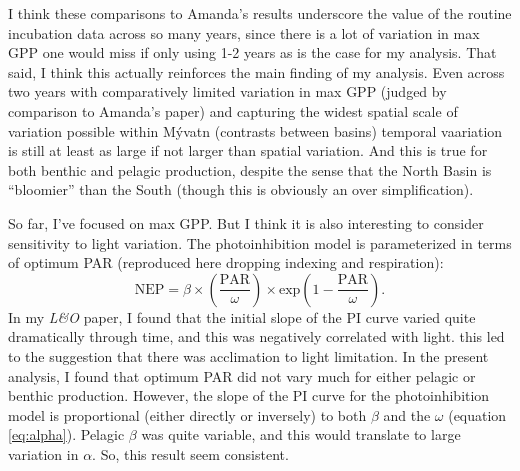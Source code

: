 \documentclass[12pt]{article}
\begin{document}
I think these comparisons to Amanda's results underscore the value of the routine incubation
data across so many years, since there is a lot of variation in max GPP one would miss
if only using 1-2 years as is the case for my analysis.
That said, I think this actually reinforces the main finding of my analysis.
Even across two years with comparatively limited variation in max GPP 
(judged by comparison to Amanda's paper) 
and capturing the widest spatial scale of variation possible within M\'{y}vatn 
(contrasts between basins) 
temporal vaariation is still at least as large if not larger than spatial variation.
And this is true for both benthic and pelagic production,
despite the sense that the North Basin is ``bloomier'' than the South 
(though this is obviously an over simplification).

So far, I've focused on max GPP. 
But I think it is also interesting to consider sensitivity to light variation.
The photoinhibition model is parameterized in terms of optimum PAR 
(reproduced here dropping indexing and respiration):
%
\begin{equation} \label{eq:pi-curve-simp}
    \text{NEP} = \beta \times 
                  \left(\frac{\text{PAR}}{\omega} \right) 
                    \times \text{exp} \left(1 - \frac{\text{PAR}}{\omega} \right).
\end{equation}
%
In my \textit{L\&O} paper, I found that the initial slope of the PI curve varied 
quite dramatically through time, and this was negatively correlated with light.
this led to the suggestion that there was acclimation to light limitation.
In the present analysis, I found that optimum PAR did not vary much for either pelagic or benthic production.
However, the slope of the PI curve for the photoinhibition model is proportional (either directly or inversely) to both $\beta$ and the $\omega$ (equation \ref{eq:alpha}).
Pelagic $\beta$ was quite variable, 
and this would translate to large variation in $\alpha$.
So, this result seem consistent.
\end{document}
